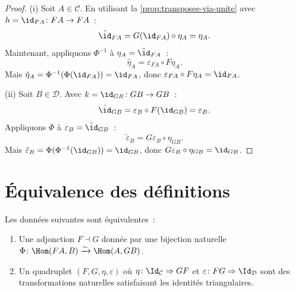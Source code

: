 \begin{proof}
(i) Soit $A\in\mathcal{C}$. En utilisant la \autoref{prop:transposee-via-unite}
avec $h=\id_{FA}\colon FA\to FA$~:
\[
    \tilde{\id}_{FA} = G(\id_{FA})\circ\eta_A = \eta_A.
\]
Maintenant, appliquons $\Phi^{-1}$ à $\eta_A = \tilde{\id}_{FA}$~:
\[
    \hat{\eta}_A = \varepsilon_{FA}\circ F\eta_A.
\]
Mais $\hat{\eta}_A = \Phi^{-1}(\Phi(\id_{FA})) = \id_{FA}$,
donc $\varepsilon_{FA}\circ F\eta_A = \id_{FA}$.

(ii) Soit $B\in\mathcal{D}$. Avec $k=\id_{GB}\colon GB\to GB$~:
\[
    \hat{\id}_{GB} = \varepsilon_B\circ F(\id_{GB}) = \varepsilon_B.
\]
Appliquons $\Phi$ à $\varepsilon_B = \hat{\id}_{GB}$~:
\[
    \tilde{\varepsilon}_B = G\varepsilon_B\circ\eta_{GB}.
\]
Mais $\tilde{\varepsilon}_B = \Phi(\Phi^{-1}(\id_{GB})) = \id_{GB}$,
donc $G\varepsilon_B\circ\eta_{GB} = \id_{GB}$.
\end{proof}


\section{Équivalence des définitions}\label{sec:equivalence-def-adjonctions}

\begin{theoreme}\label{thm:equivalence-adjonctions}
Les données suivantes sont équivalentes~:
\begin{enumerate}[label=(\alph*)]
\item Une adjonction $F\dashv G$ donnée par une bijection naturelle
      $\Phi\colon\Hom(FA,B)\xrightarrow{\sim}\Hom(A,GB)$.
\item Un quadruplet $(F,G,\eta,\varepsilon)$ où
      $\eta\colon\Id_\mathcal{C}\Rightarrow GF$ et
      $\varepsilon\colon FG\Rightarrow\Id_\mathcal{D}$
      sont des transformations naturelles satisfaisant les
      identités triangulaires.
\end{enumerate}
\end{theoreme}

